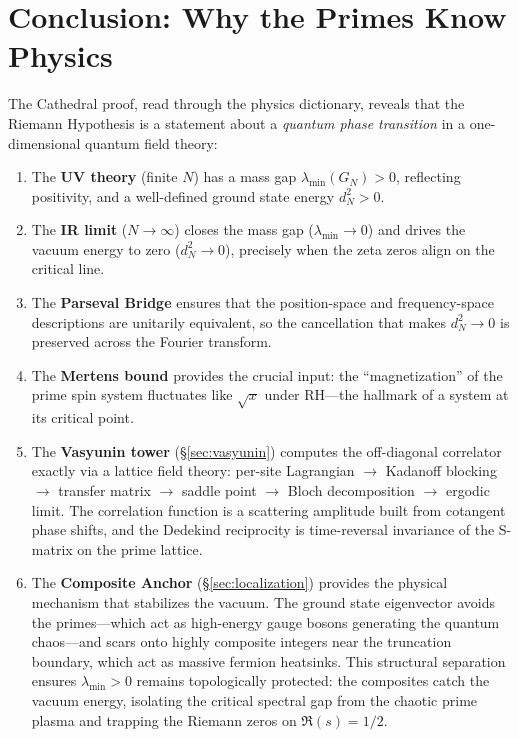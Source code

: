 \section{Conclusion: Why the Primes Know Physics}

The Cathedral proof, read through the physics dictionary, reveals that
the Riemann Hypothesis is a statement about a \emph{quantum phase
transition} in a one-dimensional quantum field theory:

\begin{enumerate}
  \item The \textbf{UV theory} (finite $N$) has a mass gap
    $\lambda_{\min}(G_N) > 0$, reflecting positivity, and a well-defined
    ground state energy $d_N^2 > 0$.

  \item The \textbf{IR limit} ($N \to \infty$) closes the mass gap
    ($\lambda_{\min} \to 0$) and drives the vacuum energy to zero
    ($d_N^2 \to 0$), precisely when the zeta zeros align on the
    critical line.

  \item The \textbf{Parseval Bridge} ensures that the position-space
    and frequency-space descriptions are unitarily equivalent, so the
    cancellation that makes $d_N^2 \to 0$ is preserved across the
    Fourier transform.

  \item The \textbf{Mertens bound} provides the crucial input: the
    ``magnetization'' of the prime spin system fluctuates like
    $\sqrt{x}$ under RH---the hallmark of a system at its critical
    point.

  \item The \textbf{Vasyunin tower} (\S\ref{sec:vasyunin}) computes the
    off-diagonal correlator exactly via a lattice field theory:
    per-site Lagrangian $\to$ Kadanoff blocking $\to$ transfer matrix
    $\to$ saddle point $\to$ Bloch decomposition $\to$ ergodic limit.
    The correlation function is a scattering amplitude built from
    cotangent phase shifts, and the Dedekind reciprocity is time-reversal
    invariance of the S-matrix on the prime lattice.

  \item The \textbf{Composite Anchor} (\S\ref{sec:localization})
    provides the physical mechanism that stabilizes the vacuum.
    The ground state eigenvector avoids the primes---which act as
    high-energy gauge bosons generating the quantum chaos---and
    scars onto highly composite integers near the truncation boundary,
    which act as massive fermion heatsinks.
    This structural separation ensures $\lambda_{\min} > 0$ remains
    topologically protected: the composites catch the vacuum energy,
    isolating the critical spectral gap from the chaotic prime plasma
    and trapping the Riemann zeros on $\Re(s) = 1/2$.


\end{enumerate}
